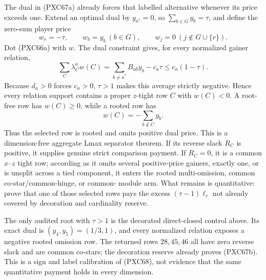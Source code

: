 \documentclass[11pt]{article}
\begin{document}
The dual in (PXC67a) already forces that labelled alternative whenever its
price exceeds one.  Extend an optimal dual by $y_{a^*}=0$, so
$\sum_{b\in G}y_b=\tau$, and define the zero-sum player price
\[
 w_r=-\tau,\qquad w_b=y_b\ (b\in G),\qquad
 w_j=0\ (j\notin G\cup\{r\}).                       \tag{PXC68a}
\]
Dot (PXC66a) with $w$.  The dual constraint gives, for every normalized
gainer relation,
\[
 \boxed{\qquad
 \sum_C\lambda^a_C w(C)
 =\sum_{b\ne a^*}B_{ab}y_b-c_a\tau
 \le c_a(1-\tau).
 \qquad}                                             \tag{PXC68}
\]
Because $d_a>0$ forces $c_a>0$, $\tau>1$ makes this average strictly
negative.  Hence every relation support contains a proper $z$-tight row
$C$ with $w(C)<0$.  A root-free row has $w(C)\ge0$, while a rooted row has
\[
 w(C)=-\sum_{b\notin C}y_b.
\]
Thus the selected row is rooted and omits positive dual price.  This is a
dimension-free aggregate Lmax separator theorem.  If its reverse slack
$R_C$ is positive, it supplies genuine strict comparison payment.  If
$R_C=0$, it is a common $x$--$z$ tight row; according as it omits several
positive-price gainers, exactly one, or is unsplit across a tied component,
it enters the rooted multi-omission, common co-star/common-hinge, or common-
module arm.  What remains is quantitative: prove that one of those selected
rows pays the excess $(\tau-1)\ell_r$ not already covered by decoration and
cardinality reserve.

The only audited root with $\tau>1$ is the decorated direct-closed control
above.  Its exact dual is $(y_4,y_5)=(1/3,1)$, and every normalized relation
exposes a negative rooted omission row.  The returned rows $28,45,46$ all
have zero reverse slack and are common co-stars; the decoration reserve
already proves (PXC67b).  This is a sign and label calibration of (PXC68),
not evidence that the same quantitative payment holds in every dimension.
\end{document}
